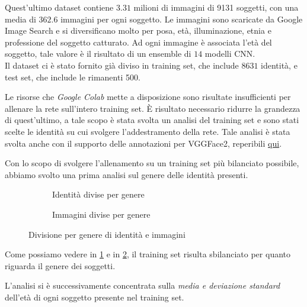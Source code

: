Quest'ultimo dataset contiene $3.31$ milioni di immagini di 9131 soggetti, con una media di $362.6$ immagini per ogni soggetto. Le immagini sono scaricate da Google Image Search e si diversificano molto per posa, età, illuminazione, etnia e professione del soggetto catturato. Ad ogni immagine è associata l'età del soggetto, tale valore è il risultato di un ensemble di $14$ modelli CNN.\\
Il dataset ci è stato fornito già diviso in training set, che include $8631$ identità, e test set, che include le rimanenti 500.

 Le risorse che \textit{Google Colab} mette a disposizione sono risultate insufficienti per allenare la rete sull'intero training set. È risultato necessario ridurre la grandezza di quest'ultimo, a tale scopo è stata svolta un analisi del training set e sono stati scelte le identità su cui svolgere l'addestramento della rete. Tale analisi è stata svolta anche con il supporto delle annotazioni per VGGFace2, reperibili \href{https://github.com/MiviaLab/GenderRecognitionFramework/releases/tag/0}{qui}.

Con lo scopo di svolgere l'allenamento su un training set più bilanciato possibile, abbiamo svolto una prima analisi sul genere delle identità presenti.

\begin{figure}[H]

\begin{subfigure}{0.5\textwidth}
\def\svgscale{0.5}

\caption{Identità divise per genere}
\label{sfig:Ids per gender}
\end{subfigure}
\begin{subfigure}{0.5\textwidth}
\def\svgscale{0.5}

\caption{Immagini divise per genere}
\label{sfig:Images per gender}
\end{subfigure}
\caption{Divisione per genere di identità e immagini}
\label{fig:gender_division}
\end{figure}

Come possiamo vedere in \ref{sfig:Ids per gender} e in \ref{sfig:Images per gender}, il training set risulta sbilanciato per quanto riguarda il genere dei soggetti.

L'analisi si è successivamente concentrata sulla \emph{media e deviazione standard} dell'età di ogni soggetto presente nel training set.

